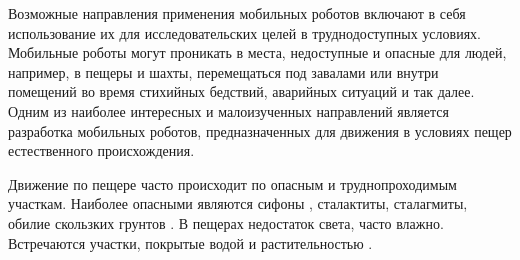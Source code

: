 {\actuality} Возможные направления применения мобильных роботов включают в себя использование их для исследовательских целей в труднодоступных условиях. Мобильные роботы могут проникать в места, недоступные и опасные для людей, например, в пещеры и шахты, перемещаться под завалами или внутри помещений во время стихийных бедствий, аварийных ситуаций и так далее. 
Одним из наиболее интересных и малоизученных направлений является разработка мобильных роботов, предназначенных для движения в условиях пещер естественного происхождения. 

Движение по пещере часто происходит по опасным и труднопроходимым участкам. Наиболее опасными являются сифоны , сталактиты, сталагмиты, обилие скользких грунтов . В пещерах недостаток света, часто влажно. Встречаются участки, покрытые водой  и растительностью .

